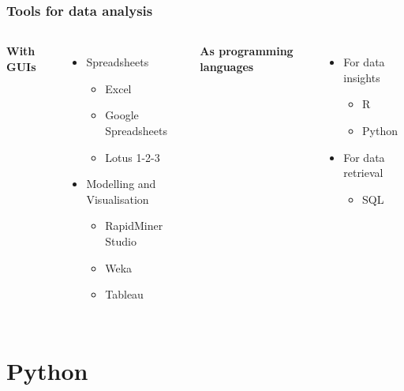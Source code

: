 \documentclass[aspectratio=169]{beamer}
\begin{document}
\begin{frame}
    \frametitle{Tools for data analysis}
    \begin{columns}[t]
            {\large \textbf{With GUIs}}
            \begin{itemize}
                \item Spreadsheets
                \begin{itemize}
                    \item Excel
                    \item Google Spreadsheets
                    \item Lotus 1-2-3
                \end{itemize}
                \item Modelling and Visualisation
                \begin{itemize}
                    \item RapidMiner Studio
                    \item Weka
                    \item Tableau
                \end{itemize}
            \end{itemize}
            {\large \textbf{As programming languages}}
            \begin{itemize}
                \item For data insights
                \begin{itemize}
                    \item R
                    \item Python
                \end{itemize}
                \item For data retrieval
                \begin{itemize}
                    \item SQL
                \end{itemize}
            \end{itemize}
    \end{columns}
\end{frame}

\section{Python}
\end{document}
